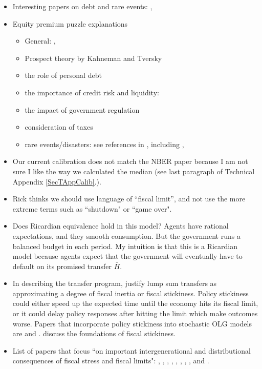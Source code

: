 \documentclass[letterpaper,12pt]{article}
\theoremstyle{definition}
\begin{document}
  \begin{itemize}
    \item Interesting papers on debt and rare events: \citet{RebeloEtAl:2019}, \citet{ReinhartEtAl:2015}
    \item Equity premium puzzle explanations
    \begin{itemize}
      \item General: \citet{DeLongMagin:2009}, \citet{FarhiGourio:2019}
      \item Prospect theory by Kahneman and Tversky
      \item the role of personal debt
      \item the importance of credit risk and liquidity: \citet{Gourio:2013}
      \item the impact of government regulation
      \item consideration of taxes
      \item rare events/disasters: see references in \citet{TsaiWachter:2015}, including \citet{Barro:2009}, \citet{Gourio:2012}
    \end{itemize}
    \item Our current calibration does not match the NBER paper because I am not sure I like the way we calculated the median (see last paragraph of Technical Appendix \ref{SecTAppCalib}.).
    \item Rick thinks we should use language of ``fiscal limit'', and not use the more extreme terms such as ``shutdown" or ``game over".
    \item Does Ricardian equivalence hold in this model? Agents have rational expectations, and they smooth consumption. But the government runs a balanced budget in each period. My intuition is that this is a Ricardian model because agents expect that the government will eventually have to default on its promised transfer $\bar{H}$.
    \item In describing the transfer program, justify lump sum transfers as approximating a degree of fiscal inertia or fiscal stickiness. Policy stickiness could either speed up the  expected time until the economy hits its fiscal limit, or it could delay policy responses after hitting the limit which make outcomes worse. Papers that incorporate policy stickiness into stochastic OLG models are \citet{AuerbachHassett:1992,AuerbachHassett:2001,AuerbachHassett:2002,AuerbachHassett:2007} and \citet{HassettMetcalf:1999}. \citet{AlesinaDrazen:1991} discuss the foundations of fiscal stickiness.
    \item List of papers that focus ``on important intergenerational and distributional consequences of fiscal stress and fiscal limits": \citet{AuerbachKotlikoff:1987}, \citet{KotlikoffSmettersWalliser:1998a,KotlikoffSmettersWalliser:1998b,KotlikoffSmettersWalliser:2007}, \citet{Imrohoroglu2Joines:1995,Imrohoroglu2Joines:1999}, \citet{HuggettVentura:1999}, \citet{CooleySoares:1999}, \citet{DeNardiImrohorogluSargent:1999}, \citet{AltigAuerbachKotlikoffSmettersWalliser:2001}, \citet{SmettersWalliser:2004}, and \citet{NishiyamaSmetters:2007}.
  \end{itemize}
\end{document}
